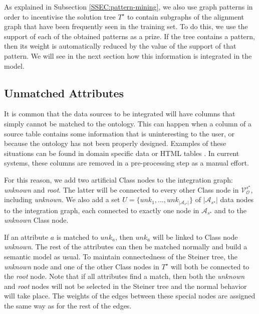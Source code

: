 \documentclass[letterpaper]{article} %
\newcommand{\authornote}[3]{
  {\fbox{\sc 
  #1}:$\blacktriangleright$\textcolor{#2}{\small{#3}}$\blacktriangleleft$}%
}
\newcommand{\ddg}[1]{\authornote{DDG}{blue}{#1}}
\begin{document}
As explained in Subsection \ref{SSEC:pattern-mining}, we also use 
graph patterns in order to incentivise the solution tree 
$T^\star$ to contain subgraphs of the alignment graph that have been frequently 
seen in the training set.
To do this, we use the support of each of the obtained patterns as a prize. If 
the tree contains a pattern, then its weight is automatically reduced by the 
value of the support of that pattern. We will see in the next section how this 
information is integrated in the model.

\subsection{Unmatched Attributes}
It is common that the data sources to be integrated will have columns that 
simply cannot be matched to the ontology.
This can happen when a column of a source table contains some information that 
is uninteresting to the user, or because the ontology has not been properly 
designed. 
Examples of these situations can be found in domain specific data 
\cite{Pham:semantic} or HTML tables \cite{Ritze:matching}.
In current systems, these columns are removed in a pre-processing step as a manual effort.

For this reason, we add two artificial Class nodes to the integration graph:  
\emph{unknown} and \emph{root}. 
The latter will be connected to every other Class node in 
$\mathcal{V}_\mathcal{O}^{s^\star}$, including \emph{unknown}.
We also add a set $U = \{unk_1,...,unk_{|\mathcal{A}_{s^\star}|}\}$ of 
$|\mathcal{A}_{s^\star}|$ data 
nodes to the integration graph, each connected to exactly one node in 
$\mathcal{A}_{s^\star}$ and to the \emph{unknown} Class node.  

If an attribute $a$ is matched to $unk_a$, then $unk_a$ will be linked to Class 
node \emph{unknown}. 
The rest of the attributes can then be matched normally 
and build  a semantic model as usual. 
To maintain connectedness of the 
Steiner tree, the \emph{unknown} node and one of the other Class nodes in $T^\star$ 
will 
both be connected to the \emph{root} node. 
Note that if all attributes find a 
match, then both the \emph{unknown} and \emph{root} nodes will not be selected in 
the Steiner tree and the normal behavior will take place.
The weights of the edges between these special nodes are
assigned the same way as for the rest of the edges.
\end{document}
